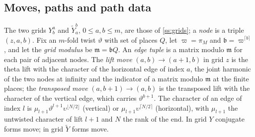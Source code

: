 \subsection{Moves, paths and path data}\label{ss:paths}
The two grids $Y^a_b$ and $\tilde Y^b_a$, $0\le a,b\le m$, are those of \cref{ss:grids}; a \emph{node} is a triple $(z,a,b)$. Fix an $m$-fold twist $\vartheta$ with set of places $Q$, let $\varpi=\pi_M$ and
$\mathfrak b=\varpi^{\lceil b\rceil}$, and let the \emph{grid modulus} be $\mathfrak m=\mathfrak bQ$. An \emph{edge tuple} is a matrix modulo $\mathfrak m$ for each pair of adjacent nodes. The \emph{lift move}
$(a,b)\to(a+1,b)$ in grid $z$ is the theta lift with the character of the horizontal edge of index $a$, the joint harmonic of the two nodes at infinity and the indicator of a matrix modulo $\mathfrak m$ at the
finite places; the \emph{transposed move} $(a,b+1)\to(a,b)$ is the transposed lift with the character of the vertical edge, which carries $\vartheta^{b+1}$. The character of an edge of index $l$ is
$\mu_{l+1}\vartheta^{l+1}\upsilon^{\lfloor N/2\rfloor}$ (vertical) or $\mu_{l+1}\upsilon^{\lceil N/2\rceil}$ (horizontal), with $\mu_{l+1}$ the untwisted character of lift $l+1$ and $N$ the rank of the end.
In grid $Y$ conjugate forms move; in grid $\tilde Y$ forms move.
